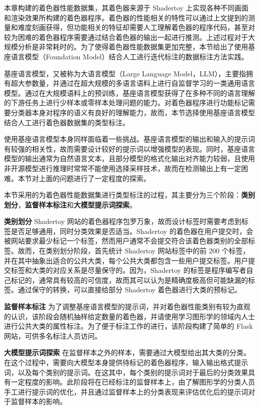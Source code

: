 {\added 本章构建的着色器性能数据集，其着色器来源于 Shadertoy 上实现各种不同画面和渲染效果所构建的着色器程序。着色器的性能相关的特性可以通过上文提到的测量和难度刻画获得，但功能相关的特征却需要人工理解着色器的程序代码，甚至对较为困难的着色器程序需要通过结合着色器的输出一起进行推测。上述过程对于大规模分析是非常耗时的。为了使得着色器性能数据集更加完整，本节给出了使用基座语言模型（Foundation Model）结合人工进行迭代标注的数据标注方法实践。

基座语言模型，又被称为大语言模型（Large Language Model，LLM），主要指拥有超大参数量，并通过在超大规模的多语言语料上进行自监督学习的一类通用语言模型。通过在大规模语料上的预训练，基座语言模型获得了在多种不同的语言理解的下游任务上进行少样本或零样本处理问题的能力。对着色器程序进行功能标记需要分类器本身对程序的语义有良好的理解能力，故而，本节选择使用基座语言模型结合人工进行着色器数据集的类型标注。

使用基座语言模型本身同样面临着一些挑战。基座语言模型的输出和输入的提示词有较强的相关性，故而需要设计较好的提示词以增强模型的表现。同时，基座语言模型的输出通常为自然语言文本，且部分模型的格式化输出对齐能力较弱，且使用非开源模型进行推理时常常不能使用选择采样技术，故而在检测输出上有一定困难。本节对上面的问题进行了一定程度的探索。

本节采用的为着色器性能数据集进行类型标注的过程，其主要分为三个阶段：{\bf 类别划分}，{\bf 监督样本标注}和{\bf 大模型提示词探索}。

{\bf 类别划分} Shadertoy 网站的着色器程序包罗万象，故而设计标签时需要考虑到标签是否足够通用，同时分类效果是否适当。Shadertoy 的着色器在用户提交时，会被网站要求最少标记一个标签，然而用户通常不会提交符合该着色器类别的全部标签。故而，在类别划分阶段，首先统计 Shadertoy 网站标签中的前 200 个标签，并在其中抽象出适合的公共大类，每个公共大类都包含一些用户提交标签。用户提交标签和大类的对应关系是尽量保守的。因为，Shadertoy 的标签是程序编写者自己标记的，通常具有较高的可信度，故而其可以认为是精确度极高但可能缺漏的标签。通过保守的转换，可以直接给部分 Shadertoy 着色器进行大类的预标记。

{\bf 监督样本标注} 为了调整基座语言模型的提示词，并对着色器性能类别有较为直观的认识，该阶段会随机抽样给定数量的着色器，并请使用学习图形学的领域内人士进行公共大类的属性标注。为了便于标注工作的进行，该阶段构建了简单的 Flask 网站，可供多名标注人员访问。

{\bf 大模型提示词探索} 在监督样本之外的样本，需要通过大模型给出其大类的分类。在这个过程中，需要向大模型本身提供待标记的着色器程序，输入输出格式提示词，以及每个类别的提示词。在这其中，每个类别的提示词对于最后的分类效果具有一定程度的影响。此阶段将在已经标注的监督样本上，由了解图形学的分类人员手工进行提示词的优化，并且通过监督样本上的分类表现来评估优化后的提示词对于监督样本的影响。

}

